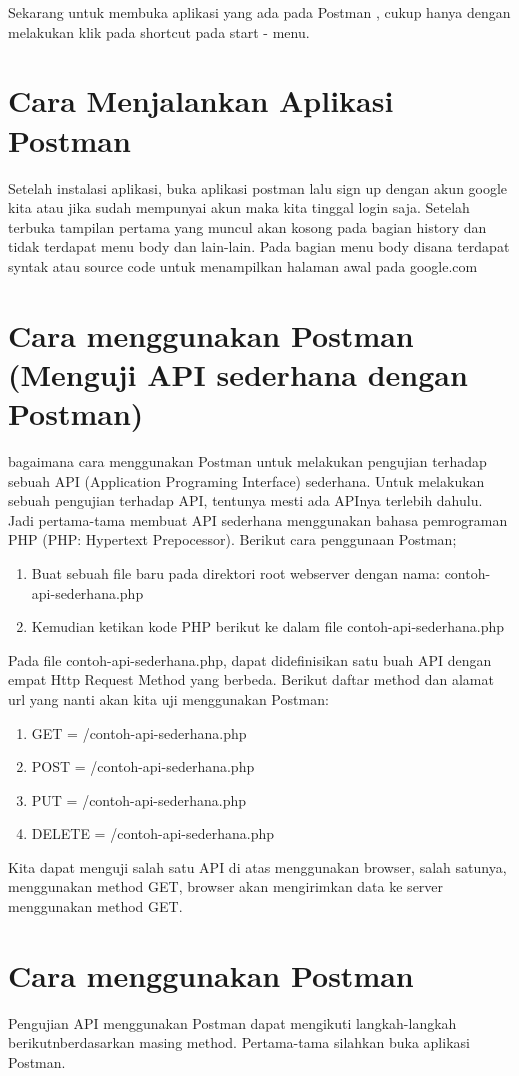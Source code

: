 Sekarang untuk membuka aplikasi yang ada pada Postman , cukup hanya dengan melakukan klik pada shortcut pada start - menu. 

\section{Cara Menjalankan Aplikasi Postman}
Setelah instalasi aplikasi, buka aplikasi postman lalu sign up dengan akun google kita atau jika sudah mempunyai akun maka kita tinggal login saja. Setelah terbuka tampilan pertama yang muncul akan kosong pada bagian history dan tidak terdapat menu body dan lain-lain. Pada bagian menu body disana terdapat syntak atau source code untuk menampilkan halaman awal pada google.com

\section{Cara menggunakan Postman (Menguji API sederhana dengan Postman)}
bagaimana cara menggunakan Postman untuk melakukan pengujian terhadap sebuah API (Application Programing Interface) sederhana.
Untuk melakukan sebuah pengujian terhadap API, tentunya mesti ada APInya terlebih dahulu. Jadi pertama-tama membuat API sederhana menggunakan bahasa pemrograman PHP (PHP: Hypertext Prepocessor).
Berikut cara penggunaan Postman; 
\begin{enumerate}
\item Buat sebuah file baru pada direktori root webserver dengan nama: contoh-api-sederhana.php 
\item Kemudian ketikan kode PHP berikut ke dalam file contoh-api-sederhana.php
\end{enumerate}
Pada file contoh-api-sederhana.php, dapat didefinisikan satu buah API dengan empat Http Request Method yang berbeda. Berikut daftar method dan alamat url yang nanti akan kita uji menggunakan Postman:
\begin{enumerate}
\item GET = /contoh-api-sederhana.php
\item POST = /contoh-api-sederhana.php
\item PUT = /contoh-api-sederhana.php
\item DELETE = /contoh-api-sederhana.php
\end{enumerate}
Kita dapat menguji salah satu API di atas menggunakan browser, salah satunya, menggunakan method GET, browser akan mengirimkan data ke server menggunakan method GET.
\section{Cara menggunakan Postman}
Pengujian API menggunakan Postman dapat mengikuti langkah-langkah berikutnberdasarkan masing method. Pertama-tama silahkan buka aplikasi Postman.
